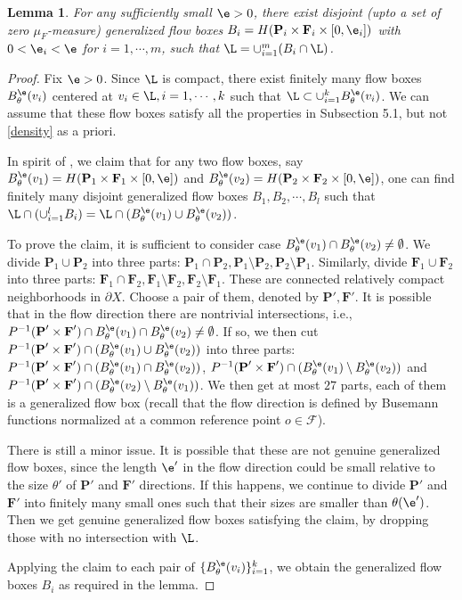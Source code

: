 \documentclass[11pt]{amsart}
\newtheorem{lemma}[theorem]{Lemma}
\theoremstyle{definition}
\newcommand{\F}{\mathcal{F}}
\def\pX{{\partial X}}
\def\t{\theta}
\def\bP{\textbf{P}}
\def\bF{\textbf{F}}
\begin{document}
\begin{lemma}\label{partition}
For any sufficiently small $\e>0$, there exist disjoint (upto a set of zero $\mu_F$-measure)  generalized flow boxes $B_i=H(\bP_i\times \bF_i\times [0,\e_i])$ with $0<\e_i<\e$ for $i=1,\cdots,m$, such that $\L=\cup_{i=1}^m(B_i\cap \L)$.
\end{lemma}
\begin{proof}
Fix $\e>0$. Since $\L$ is compact, there exist finitely many flow boxes $B_\t^\e(v_i)$ centered at $v_i\in \L, i=1,\cdots,k$ such that $\L\subset \cup_{i=1}^k B^\e_\t(v_i)$. We can assume that these flow boxes satisfy all the properties in Subsection 5.1, but not \eqref{density} as a priori.

In spirit of  \cite[Lemma 9.5.6]{BP}, we claim that for any two flow boxes, say $B^\e_\t(v_1)=H(\bP_1\times \bF_1\times [0,\e])$ and  $B^\e_\t(v_2)=H(\bP_2\times \bF_2\times [0,\e])$, one can find finitely many disjoint generalized flow boxes $B_1,B_2,\cdots,B_l$ such that $\L\cap (\cup_{i=1}^lB_i)=\L\cap (B^\e_\t(v_1)\cup B^\e_\t(v_2))$.

To prove the claim, it is sufficient to consider case $B^\e_\t(v_1)\cap B^\e_\t(v_2)\neq \emptyset$. We divide $\bP_1\cup \bP_2$ into three parts: $\bP_1\cap \bP_2, \bP_1\setminus \bP_2, \bP_2\setminus \bP_1$. Similarly, divide $\bF_1\cup \bF_2$ into three parts: $\bF_1\cap \bF_2, \bF_1\setminus \bF_2, \bF_2\setminus \bF_1$. These are connected relatively compact neighborhoods in $\pX$. Choose a pair of them, denoted by $\bP', \bF'$. It is possible that in the flow direction there are nontrivial intersections, i.e., $P^{-1}(\bP'\times  \bF')\cap B^\e_\t(v_1)\cap B^\e_\t(v_2)\neq \emptyset$. If so, we then cut $P^{-1}(\bP'\times  \bF')\cap (B^\e_\t(v_1)\cup B^\e_\t(v_2))$ into three parts: $P^{-1}(\bP'\times  \bF')\cap (B^\e_\t(v_1)\cap B^\e_\t(v_2))$, $P^{-1}(\bP'\times  \bF')\cap(B^\e_\t(v_1)\setminus B^\e_\t(v_2))$ and $P^{-1}(\bP'\times  \bF')\cap (B^\e_\t(v_2)\setminus B^\e_\t(v_1))$. We then get at most $27$ parts, each of them is a generalized flow box (recall that the flow direction is defined by Busemann functions normalized at a common reference point $o\in \F$).

There is still a minor issue. It is possible that these are not genuine generalized flow boxes, since the length $\e'$ in the flow direction could be small relative to the size $\t'$ of $\bP'$ and $\bF'$ directions. If this happens, we continue to divide $\bP'$ and $\bF'$ into finitely many small ones such that their sizes are smaller than $\t(\e')$. Then we get genuine generalized flow boxes satisfying the claim, by dropping those with no intersection with $\L$.

Applying the claim to each pair of $\{B^\e_\t(v_i)\}_{i=1}^k$, we obtain the generalized flow boxes $B_i$ as required in the lemma.
\end{proof}
\end{document}
